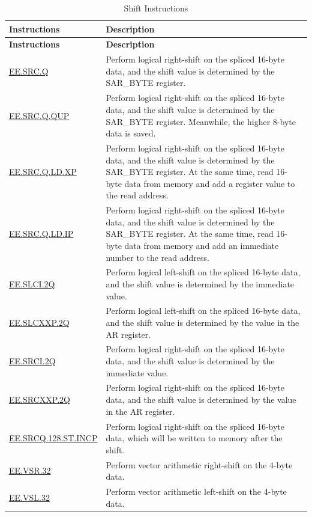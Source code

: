 \begin{longtable}[c]{|l|m{11cm}|}
    \caption{Shift Instructions}
    \label{tab:pie-shift-instructions}\\
    \hline
    \rowcolor{lightgray}
    \textbf{Instructions} & \textbf{Description} \\\hline
    \endfirsthead
    \rowcolor{lightgray}
    \textbf{Instructions} & \textbf{Description} \\\hline
    \endhead
    \endfoot
    
    \hyperref[instruction:EESRCQ]{EE.SRC.Q} & Perform logical right-shift on the spliced 16-byte data, and the shift value is determined by the SAR\_BYTE register.
    \\\hline
    \hyperref[instruction:EESRCQQUP]{EE.SRC.Q.QUP} & Perform logical right-shift on the spliced 16-byte data, and the shift value is determined by the SAR\_BYTE register. Meanwhile, the higher 8-byte data is saved.
    \\\hline
    \hyperref[instruction:EESRCQLDXP]{EE.SRC.Q.LD.XP} & Perform logical right-shift on the spliced 16-byte data, and the shift value is determined by the SAR\_BYTE register. At the same time, read 16-byte data from memory and add a register value to the read address.
    \\\hline
    \hyperref[instruction:EESRCQLDIP]{EE.SRC.Q.LD.IP} & Perform logical right-shift on the spliced 16-byte data, and the shift value is determined by the SAR\_BYTE register. At the same time, read 16-byte data from memory and add an immediate number to the read address.
    \\\hline
    \hyperref[instruction:EESLCI2Q]{EE.SLCI.2Q} & Perform logical left-shift on the spliced 16-byte data, and the shift value is determined by the immediate value.
    \\\hline
    \hyperref[instruction:EESLCXXP2Q]{EE.SLCXXP.2Q} & Perform logical left-shift on the spliced 16-byte data, and the shift value is determined by the value in the AR register.
    \\\hline
    \hyperref[instruction:EESRCI2Q]{EE.SRCI.2Q} & Perform logical right-shift on the spliced 16-byte data, and the shift value is determined by the immediate value.
    \\\hline
    \hyperref[instruction:EESRCXXP2Q]{EE.SRCXXP.2Q} & Perform logical right-shift on the spliced 16-byte data, and the shift value is determined by the value in the AR register.
    \\\hline
    \hyperref[instruction:EESRCQ128STINCP]{EE.SRCQ.128.ST.INCP} & Perform logical right-shift on the spliced 16-byte data, which will be written to memory after the shift.
    \\\hline
    \hyperref[instruction:EEVSR32]{EE.VSR.32} & Perform vector arithmetic right-shift on the 4-byte data.
    \\\hline
    \hyperref[instruction:EEVSL32]{EE.VSL.32} & Perform vector arithmetic left-shift on the 4-byte data.
    \\\hline
\end{longtable}